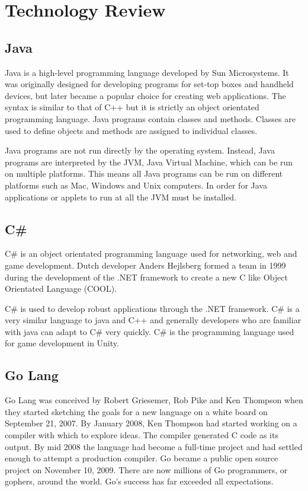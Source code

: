 
\chapter{Technology Review}





\section {Java}
Java is a high-level programming language developed by Sun Microsystems. It was originally designed for developing programs for set-top boxes and handheld devices, but later became a popular choice for creating web applications. The syntax is similar to that of C++ but it is strictly an object orientated programming language. Java programs contain classes and methods. Classes are used to define objects and methods are assigned to individual classes.\newline

Java programs are not run directly by the operating system. Instead, Java programs are interpreted by the JVM, Java Virtual Machine, which can be run on multiple platforms. This means all Java programs can be run on different platforms such as Mac, Windows and Unix computers.  In order for Java applications or applets to run at all the JVM must be installed.\newline

\section {C\#}
C\# is an object orientated programming language used for networking, web and game development. Dutch developer Anders Hejlsberg formed a team in 1999 during the development of the .NET framework to create a new C like Object Orientated Language (COOL).
\newline

C\# is used to develop robust applications through the .NET framework. C\# is a very similar language to java and C++ and generally developers who are familiar with java can adapt to C\# very quickly. C\# is the programming language used for game development in Unity.
\newline

\section {Go Lang}
Go Lang was conceived by Robert Griesemer, Rob Pike and Ken Thompson when they started sketching the goals for a new language on a white board on September 21, 2007. By January 2008, Ken Thompson had started working on a compiler with which to explore ideas. The compiler generated C code as its output. By mid 2008 the language had become a full-time project and had settled enough to attempt a production compiler. Go became a public open source project on November 10, 2009. There are now millions of Go programmers, or gophers, around the world. Go's success has far exceeded all expectations.\newline

